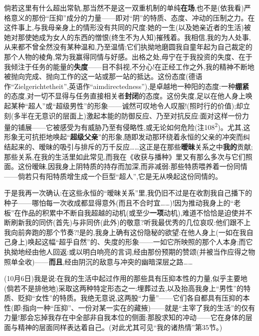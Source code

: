 \dmark{}倘若这里有什么超出常轨,那当然不是这一双重机制的单纯\textbf{在场},也不是(依我看)严格意义的那份“压抑”成分的力量——即对“阴”的特质、态度、冲动的压制之力。在这件事上,与我母亲身上的情形没有共同的尺度:她的一生(以及她亲近者的生活)被她对那使她成为女人的东西的憎恨(终生不为人知)摧残着。我相信,我的为人处事,从来都不曾全然没有某种温和,乃至温情;它们执拗地磨圆我自童年起为自己裁定的那个人物的棱角,常为我赢得同情与好感。出格之处,毋宁在于我投资的失度、在于我倾注于任务的能量的\textbf{失度}——目不斜视,不分心!在正经工作之外,我的精神不断地被抛向完成、抛向工作的这一站或那一站的抵达。这份态度(德语作“Zielgerichtetheit”,英语作“aimdirectedness”),是卓越地一种阳的态度:一种\textbf{绷紧}的态度,对一切不显得与任务直接相关者\textbf{封闭}的态度。这份失度,足以在他人身上唤起某种“超人”或“超级男性”的形象——诚然可叹地令人叹服!(照时行的价值);却立刻(多半在无意识的层面上)激起本能的防御反应、乃至对抗反应:面对这样一份力量的铺展——它被感受为有威胁乃至有侵略性,或无论如何危险(注108\textsuperscript{2})。尤其,这形象无可抗拒地唤起“\textbf{超级父亲}”的形象,随即发动那环绕着永恒的父亲的冲突而纠结起来的、暧昧的吸引与排斥的万千反应……这正是在那些\textbf{暧昧}关系之中\textbf{我的}贡献;那些关系,在我的生活里如此常见,而我在《收获与播种》里又有那么多次与它们照面。这份暧昧,因我身上阴特质的持存而加深,而非减弱:那些特质喂养着一份同情——倘若只有阳特质增生成一个巨型“超人”,它是无从唤起这份同情的。

于是我再一次确认:在这些永恒的“暧昧关系”里,我仍旧不过是在收割我自己播下的种子——哪怕每一次收成都显得意外(而且不合时宜……)!因为推动我身上的“老板”在作品的积累中不断自我超越的动机(或至少\textbf{一项}动机),难道不恰恰是迫使并不断刷新我的同侪(首先)与非同侪(此外)的敬意?听我最优秀的几位哀叹:他们跟不上我向前奔跑的那个节奏?!是的,我身上确有这份隐秘的欲望:在他人身上(一如在我自己身上)唤起这幅“超乎自然”的、失度的形象——一如它所映照的那个人本身;而它执拗地经由他人回返:或以明白响亮的言词,经由那份预期的赞颂(并被当作应得之物照单全收)——\textbf{而且},经由阴沉的敌意与冲突的幽暗深层之路……

\label{ch18:local:n7}

\dmark{}(10月6日)我是说:在我的生活中起过作用的那些具有压抑本性的力量,似乎主要地(倘若不是排他地)采取这两种特定形态之一:埋葬过去,以及抬高我身上“男性”的特质、贬抑“女性”的特质。我绝无意说,这两股“力量”——它们各自都具有压抑的本性(即:指向一种“压抑”、一份对某一实在的藏掖)——就是“主宰了我的生活”的仅有力量!那会忘掉我存在中全部非自我本位的侧面:那股求知的冲动——它在身体的层面与精神的层面同样表达着自己。(对此尤其可见“我的诸热情”第35节。)

